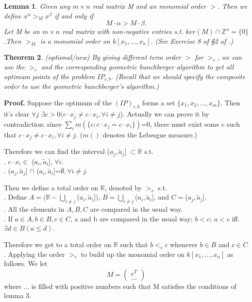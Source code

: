 \documentclass{article}
\theoremstyle{plain}
\newtheorem{theorem}{Theorem}[section]
\newtheorem{lemma}[theorem]{Lemma}
\theoremstyle{definition}
\begin{document}
\begin{lemma} Given any $m \times n$ real matrix M and an monomial order $>$. Then we define $x^{\alpha}>_M x^{\beta}$ if and only if $$ M\cdot \alpha >M\cdot \beta.$$ Let M be an $m \times n$ real matrix with non-negative entries s.t. $ker(M) \cap \mathbb{Z}^{n}= \{0\}$.Then $>_M$ is a monomial order on $k[x_1, . . . , x_n]$. (See Exercise 8 of §2 of \cite{ref2}.) \end{lemma}

\begin{theorem} (optional/new)  By giving different term order $>$ for $>_c$, we can use the $>_c$ and the corresponding geometric bunchberger algorithm to get all optimum points of the problem $IP_{c,b}$. (Recall that we should specify the composite order to use the geometric bunchberger's algorithm.)\end{theorem}

\noindent\textbf{Proof.}  Suppose the optimum of the $(IP)_{c,b}$ forms a set $\{x_1,x_2,...,x_m\}$. Then it's clear $\forall j$ $ \exists c>0( c\cdot x_j\neq c\cdot x_i,\forall i\neq j$). Actually we can prove it by contradiction: since $\sum_{i}m(\{c:c\cdot x_j= c\cdot x_i\})$=0, there must exist some c such that $c\cdot x_j\neq c\cdot x_i,\forall i\neq j$. ($m()$ denotes the Lebesgue measure.)

Therefore we can find the interval ($a_j,\tilde{a}_j$] $\subset \mathbb{R}$ s.t. \\
\indent {}. $c\cdot x_i \in$ ($a_i,\tilde{a}_i$], $\forall i$.  \\
\indent  {}. ($a_j,\tilde{a}_j$] $\cap$  ($a_i,\tilde{a}_i$]=$\emptyset,\forall i\neq j$.  

Then we define a total order on $\mathbb{R}$, denoted by $>_{s}$ s.t.  \\
\indent {}. Define $ A=\big(\mathbb{R}-\bigcup_{i\neq j}$($a_i,\tilde{a}_i$]$\big)$, $B = \bigcup_{i\neq j}$($a_i,\tilde{a}_i$], and $C =$($a_j,\tilde{a}_j$]. \\
\indent {}. All the elements in $A,B,C$ are compared in the usual way. \\
\indent {}. If $a\in A,b\in B,c\in C$, a and b are compared in the usual way; $b<c$; $a<c$ iff.  $\exists d\in B(a \leq d)$. 

Therefore we get to a total order on $\mathbb{R}$ such that $b<_{s}c$ whenever $b\in B$ and $c\in C$. Applying the order $>_{s}$ to build up the monomial order on $k[x_1, . . . , x_n]$ as follows. We let
$$M=\begin{pmatrix} c^T \\ ... \end{pmatrix}$$
where $...$ is filled with positive numbers such that M satisfies the conditions of lemma 3.
\end{document}
